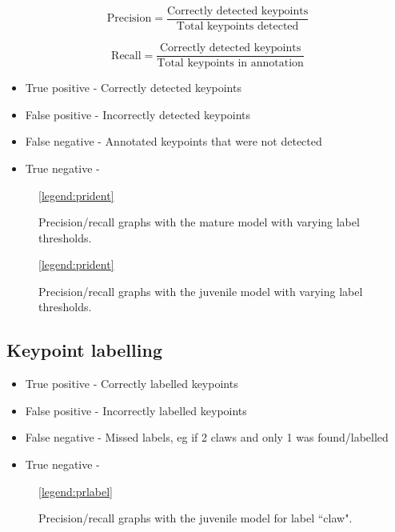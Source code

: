 \begin{equation}
\text{Precision} = \frac{\text{Correctly detected keypoints}}{\text{Total keypoints detected}}
\end{equation}

\begin{equation}
\text{Recall} = \frac{\text{Correctly detected keypoints}}{\text{Total keypoints in annotation}}
\end{equation}

\begin{itemize}
\item True positive - Correctly detected keypoints
\item False positive - Incorrectly detected keypoints
\item False negative - Annotated keypoints that were not detected
\item True negative - 
\end{itemize}



\begin{figure}[H]
\centering
{}
\ref{legend:prident}
\caption{Precision/recall graphs with the mature model with varying label thresholds.}
\end{figure}

\begin{figure}[H]
\centering
{}
\ref{legend:prident}
\caption{Precision/recall graphs with the juvenile model with varying label thresholds.}
\end{figure}

\subsection{Keypoint labelling}


\begin{itemize}
\item True positive - Correctly labelled keypoints
\item False positive - Incorrectly labelled keypoints
\item False negative - Missed labels, eg if 2 claws and only 1 was found/labelled
\item True negative - 
\end{itemize}

\begin{figure}[H]
\centering
{}
\ref{legend:prlabel}
\caption{Precision/recall graphs with the juvenile model for label ``claw". }
\end{figure}


